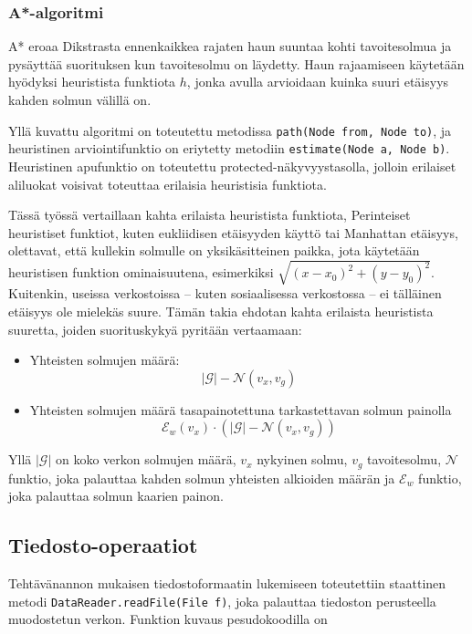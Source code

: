 \documentclass[10pt,a4paper]{article}
\begin{document}
\subsubsection{A*-algoritmi}

A* eroaa Dikstrasta ennenkaikkea rajaten haun suuntaa kohti tavoitesolmua ja pysäyttää suorituksen kun tavoitesolmu on läydetty. Haun rajaamiseen käytetään hyödyksi heuristista funktiota $h$, jonka avulla arvioidaan kuinka suuri etäisyys kahden solmun välillä on.

Yllä kuvattu algoritmi on toteutettu metodissa \texttt{path(Node from, Node to)}, ja heuristinen arviointifunktio on eriytetty metodiin \texttt{estimate(Node a, Node b)}. Heuristinen apufunktio on toteutettu protected-näkyvyystasolla, jolloin erilaiset aliluokat voisivat toteuttaa erilaisia heuristisia funktiota.

Tässä työssä vertaillaan kahta erilaista heuristista funktiota, Perinteiset heuristiset funktiot, kuten eukliidisen etäisyyden käyttö tai Manhattan etäisyys, olettavat, että kullekin solmulle on yksikäsitteinen paikka, jota käytetään heuristisen funktion ominaisuutena, esimerkiksi $\sqrt{ (x-x_0)^2 + (y-y_0)^2 }$. Kuitenkin, useissa verkostoissa -- kuten sosiaalisessa verkostossa -- ei tälläinen etäisyys ole mielekäs suure. Tämän takia ehdotan kahta erilaista heuristista suuretta, joiden suorituskykyä pyritään vertaamaan:

\begin{itemize}
\item Yhteisten solmujen määrä: $$ |\mathcal{G}| - \mathcal{N}( v_x , v_g )$$
\item Yhteisten solmujen määrä tasapainotettuna tarkastettavan solmun painolla $$ \mathcal{E}_w ( v_x ) \cdot ( |\mathcal{G}| - \mathcal{N}( v_x , v_g ) ) $$
\end{itemize}

Yllä $|\mathcal{G}|$ on koko verkon solmujen määrä, $v_x$ nykyinen solmu, $v_g$ tavoitesolmu, $\mathcal{N}$ funktio, joka palauttaa kahden solmun yhteisten alkioiden määrän ja $ \mathcal{E}_w $ funktio, joka palauttaa solmun kaarien painon.

\subsection{Tiedosto-operaatiot}
\label{io}

Tehtävänannon mukaisen tiedostoformaatin lukemiseen toteutettiin staattinen metodi \texttt{DataReader.readFile(File f)}, joka palauttaa tiedoston perusteella muodostetun verkon. Funktion kuvaus pesudokoodilla on
\end{document}
